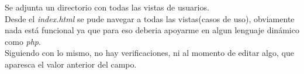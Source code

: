
Se adjunta un directorio con todas las vistas de usuarios.\\
Desde el \emph{index.html} se pude navegar a todas las vistas(casos de uso), obviamente nada está funcional
ya que para eso deberia apoyarme en algun lenguaje dinámico como \emph{php}.\\
Siguiendo con lo mismo, no hay verificaciones, ni al momento de editar algo, que aparesca el valor anterior del campo.

